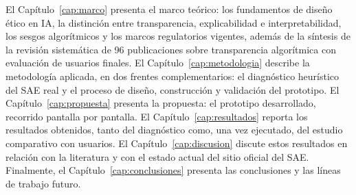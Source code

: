 El Capítulo~\ref{cap:marco} presenta el marco teórico: los fundamentos de diseño ético en IA, la distinción entre transparencia, explicabilidad e interpretabilidad, los sesgos algorítmicos y los marcos regulatorios vigentes, además de la síntesis de la revisión sistemática de 96 publicaciones sobre transparencia algorítmica con evaluación de usuarios finales. El Capítulo~\ref{cap:metodologia} describe la metodología aplicada, en dos frentes complementarios: el diagnóstico heurístico del SAE real y el proceso de diseño, construcción y validación del prototipo. El Capítulo~\ref{cap:propuesta} presenta la propuesta: el prototipo desarrollado, recorrido pantalla por pantalla. El Capítulo~\ref{cap:resultados} reporta los resultados obtenidos, tanto del diagnóstico como, una vez ejecutado, del estudio comparativo con usuarios. El Capítulo~\ref{cap:discusion} discute estos resultados en relación con la literatura y con el estado actual del sitio oficial del SAE. Finalmente, el Capítulo~\ref{cap:conclusiones} presenta las conclusiones y las líneas de trabajo futuro.
